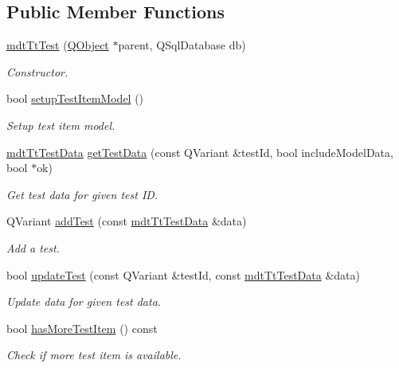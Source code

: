\subsection*{Public Member Functions}
\begin{DoxyCompactItemize}
\item 
\hyperlink{classmdt_tt_test_a607eadd86d30aa34dbd9daaf4c03725c}{mdt\-Tt\-Test} (\hyperlink{class_q_object}{Q\-Object} $\ast$parent, Q\-Sql\-Database db)
\begin{DoxyCompactList}\small\item\em Constructor. \end{DoxyCompactList}\item 
bool \hyperlink{classmdt_tt_test_ace65d76861e3063f80e11e38c98d14f7}{setup\-Test\-Item\-Model} ()
\begin{DoxyCompactList}\small\item\em Setup test item model. \end{DoxyCompactList}\item 
\hyperlink{classmdt_tt_test_data}{mdt\-Tt\-Test\-Data} \hyperlink{classmdt_tt_test_a8361b08fa6ac07c4c06321096c56e570}{get\-Test\-Data} (const Q\-Variant \&test\-Id, bool include\-Model\-Data, bool $\ast$ok)
\begin{DoxyCompactList}\small\item\em Get test data for given test I\-D. \end{DoxyCompactList}\item 
Q\-Variant \hyperlink{classmdt_tt_test_a5ae4f51487fe7d80d7b070c675f92f05}{add\-Test} (const \hyperlink{classmdt_tt_test_data}{mdt\-Tt\-Test\-Data} \&data)
\begin{DoxyCompactList}\small\item\em Add a test. \end{DoxyCompactList}\item 
bool \hyperlink{classmdt_tt_test_a80ebc41b5e9e23aadea11e63207ed09c}{update\-Test} (const Q\-Variant \&test\-Id, const \hyperlink{classmdt_tt_test_data}{mdt\-Tt\-Test\-Data} \&data)
\begin{DoxyCompactList}\small\item\em Update data for given test data. \end{DoxyCompactList}\item 
bool \hyperlink{classmdt_tt_test_a3c130673f9291a7753e691c051c12c2b}{has\-More\-Test\-Item} () const 
\begin{DoxyCompactList}\small\item\em Check if more test item is available. \end{DoxyCompactList}\item 

\end{DoxyCompactItemize}
